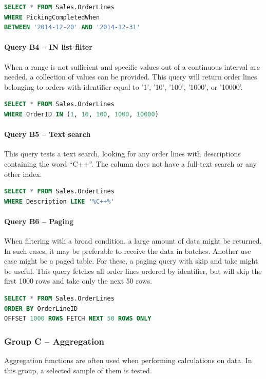 \begin{lstlisting}[language=SQL]
SELECT * FROM Sales.OrderLines 
WHERE PickingCompletedWhen 
BETWEEN '2014-12-20' AND '2014-12-31'
\end{lstlisting}

\paragraph{Query B4 -- IN list filter}
\label{query:b4}
When a range is not sufficient and specific values out of a continuous interval are needed, a collection of values can be provided.
This query will return order lines belonging to orders with identifier equal to '1', '10', '100', '1000', or '10000'.

\begin{lstlisting}[language=SQL]
SELECT * FROM Sales.OrderLines 
WHERE OrderID IN (1, 10, 100, 1000, 10000)
\end{lstlisting}

\paragraph{Query B5 -- Text search}
\label{query:b5}
This query tests a text search, looking for any order lines with descriptions containing the word ``C++''.  The column does not have a full-text search or any other index.

\begin{lstlisting}[language=SQL]
SELECT * FROM Sales.OrderLines 
WHERE Description LIKE '%C++%'
\end{lstlisting}

\paragraph{Query B6 -- Paging}
\label{query:b6}
When filtering with a broad condition, a large amount of data might be returned. In such cases, it may be preferable to receive the data in batches. Another use case might be a paged table. For these, a paging query with skip and take might be useful.
This query fetches all order lines ordered by identifier, but will skip the first 1000 rows and take only the next 50 rows.

\begin{lstlisting}[language=SQL]
SELECT * FROM Sales.OrderLines 
ORDER BY OrderLineID 
OFFSET 1000 ROWS FETCH NEXT 50 ROWS ONLY
\end{lstlisting}

\subsubsection{Group C -- Aggregation}
Aggregation functions are often used when performing calculations on data. In this group, a selected sample of them is tested.

